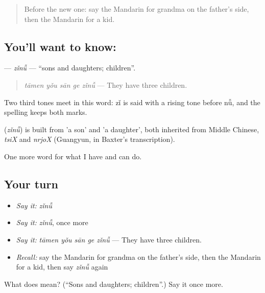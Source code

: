 \label{lesson:ZH-C253-zinu}



\begin{quote}
Before the new one: say the Mandarin for grandma on the father's side, then the Mandarin for a kid.
\end{quote}

\subsection*{You'll want to know: }
\textbf{} — \emph{zǐnǚ} — \textquotedblleft{}sons and daughters; children\textquotedblright{}.

\begin{quote}
\textbf{} \emph{tāmen yǒu sān ge zǐnǚ} — They have three children.
\end{quote}

Two third tones meet in this word: zǐ is said with a rising tone before nǚ, and the spelling keeps both marks.

\begin{cousinweb}
\textbf{} (\emph{zǐnǚ}) is built from  'a son' and  'a daughter', both inherited from Middle Chinese, \emph{tsiX} and \emph{nrjoX} (Guangyun, in Baxter's transcription).
\end{cousinweb}

\begin{grammarlens}[title={What you've built}]
One more word for what I have and can do.
\end{grammarlens}

\subsection*{Your turn}
\begin{itemize}
\raggedright
  \item \emph{Say it:} \emph{zǐnǚ}
  \item \emph{Say it:} \emph{zǐnǚ}, once more
  \item \emph{Say it:} \emph{tāmen yǒu sān ge zǐnǚ} — They have three children.
  \item \emph{Recall:} say the Mandarin for grandma on the father's side, then the Mandarin for a kid, then say \emph{zǐnǚ} again
\end{itemize}

\begin{tcolorbox}[breakable,colback=teal!4,colframe=teal!35!black,title={Before you move on}]
What does  mean? (\textquotedblleft{}Sons and daughters; children\textquotedblright{}.) Say it once more.
\end{tcolorbox}
